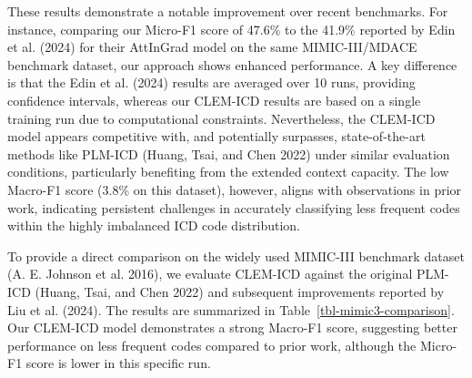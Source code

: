 \documentclass[
]{article}
\begin{document}
These results demonstrate a notable improvement over recent benchmarks.
For instance, comparing our Micro-F1 score of 47.6\% to the 41.9\%
reported by Edin et al. (2024) for their AttInGrad model on the same
MIMIC-III/MDACE benchmark dataset, our approach shows enhanced
performance. A key difference is that the Edin et al. (2024) results are
averaged over 10 runs, providing confidence intervals, whereas our
CLEM-ICD results are based on a single training run due to computational
constraints. Nevertheless, the CLEM-ICD model appears competitive with,
and potentially surpasses, state-of-the-art methods like PLM-ICD (Huang,
Tsai, and Chen 2022) under similar evaluation conditions, particularly
benefiting from the extended context capacity. The low Macro-F1 score
(3.8\% on this dataset), however, aligns with observations in prior
work, indicating persistent challenges in accurately classifying less
frequent codes within the highly imbalanced ICD code distribution.

To provide a direct comparison on the widely used MIMIC-III benchmark
dataset (A. E. Johnson et al. 2016), we evaluate CLEM-ICD against the
original PLM-ICD (Huang, Tsai, and Chen 2022) and subsequent
improvements reported by Liu et al. (2024). The results are summarized
in Table~\ref{tbl-mimic3-comparison}. Our CLEM-ICD model demonstrates a
strong Macro-F1 score, suggesting better performance on less frequent
codes compared to prior work, although the Micro-F1 score is lower in
this specific run.
\end{document}
